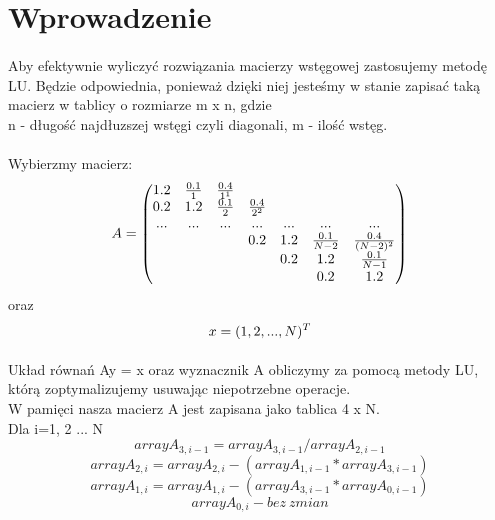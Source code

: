 \documentclass{article}
\begin{document}
\section{Wprowadzenie}

\paragraph{}

Aby efektywnie wyliczyć rozwiązania macierzy wstęgowej zastosujemy metodę LU. Będzie odpowiednia, ponieważ 
dzięki niej jesteśmy w stanie zapisać taką macierz w tablicy o rozmiarze m x n, gdzie \\
 n - długość najdłuzszej wstęgi czyli diagonali, m - ilość wstęg. \\
\paragraph{}
Wybierzmy macierz: \\
\begin{equation*}
 \medskip
A = \begin{pmatrix}
    1.2 & \frac{0.1}{1} & \frac{0.4}{1^{1}} \\ 
    0.2 & 1.2 & \frac{0.1}{2} & \frac{0.4}{2^{2}} \\ 
    ... & ... & ... & ... & ... & ... & ...  \\
     &&& 0.2 & 1.2 & \frac{0.1}{N-2} & \frac{0.4}{(N-2)^{2}} \\ 
     && & & 0.2  & 1.2 & \frac{0.1}{N-1} \\
    &&&&&0.2&1.2
    \end{pmatrix}
\end{equation*}
oraz
\begin{equation*}
 x = (1, 2,...,N)^T \\
\end{equation*}

\smallskip
\paragraph{}
Układ równań Ay = x oraz wyznacznik A obliczymy za pomocą metody LU, którą zoptymalizujemy usuwając niepotrzebne operacje. \\
W pamięci nasza macierz A jest zapisana jako tablica 4 x N. \\
\medskip
Dla i=1, 2 ... N
\[ arrayA_{3, i-1} = arrayA_{3, i-1} / arrayA_{2, i-1} \]
\[ arrayA_{2, i} = arrayA_{2, i} - (arrayA_{1, i-1} * arrayA_{3, i-1})\]
\[arrayA_{1, i} = arrayA_{1, i} - (arrayA_{3, i-1} * arrayA_{0, i-1}) \]
\[ arrayA_{0, i}-bez\ zmian\]
\end{document}
